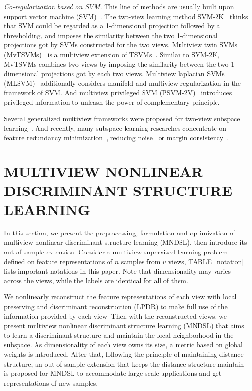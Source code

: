 \documentclass[journal]{IEEEtran}
\begin{document}
\textit{Co-regularization based on SVM.}
This line of methods are usually built upon support vector machine (SVM)~\cite{SVM}. 
The two-view learning method SVM-2K~\cite{SVM-2K} thinks that SVM could be regarded as a 1-dimensional projection followed by a thresholding, 
and imposes the similarity between the two 1-dimensional projections got by SVMs constructed for the two views. 
Multiview twin SVMs (MvTSVMs)~\cite{MvTSVMs} is a multiview extension of TSVMs~\cite{TSVMs}. 
Similar to SVM-2K, MvTSVMs combines two views by imposing the similarity between the two 1-dimensional projections got by each two views. 
Multiview laplacian SVMs (MLSVM)~\cite{MLSVM} additionally considers manifold and multiview regularization in the framework of SVM. 
And multiview privileged SVM (PSVM-2V)~\cite{PSVM-2V} introduces privileged information to unleash the power of complementary principle. 

Several generalized multiview frameworks were proposed for two-view subspace learning~\cite{GMA,GME}. 
And recently, many subspace learning researches concentrate on feature redundancy minimization~\cite{zhou2018multiview}, reducing noise~\cite{yue2019robust} or margin consistency~\cite{MvMED,MED-2C}. 




\section{MULTIVIEW NONLINEAR DISCRIMINANT STRUCTURE LEARNING} \label{proposedmethods}
In this section, we present the preprocessing, formulation and optimization of multiview nonlinear discriminant structure learning (MNDSL), then introduce its out-of-sample extension. 
Consider a multiview supervised learning problem defined on feature representations of $n$ samples from $v$ views, TABLE~\ref{notation} lists important notations in this paper. 
Note that dimensionality may varies across the views, while the labels are identical for all of them. 

We nonlinearly reconstruct the feature representations of each view with local preserving and discriminant reconstruction (LPDR) to make full use of the information provided by each view. 
Then with the reconstructed views, we present multiview nonlinear discriminant structure learning (MNDSL) that aims to learn a discriminant structure and maintain the local neighborhood in the subspace. 
As dimensionality of each view owns its size, a metric based on global weights is introduced. 
After that, following the principle of maintaining distance structure, an out-of-sample extension that keeps the distance structure maintain is proposed for MNDSL to accommodate large-scale applications and get representations of new samples. 
\end{document}
